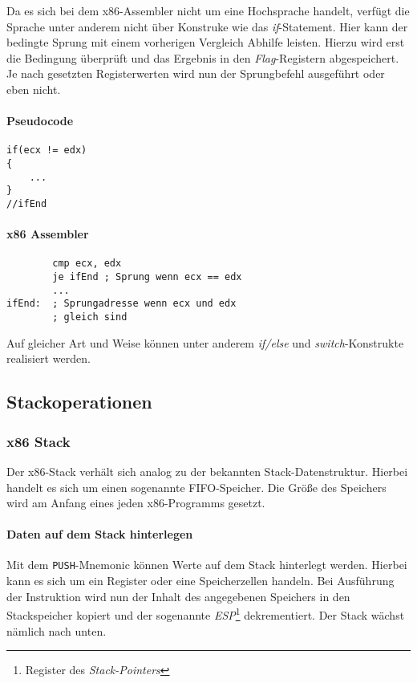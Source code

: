 Da es sich bei dem x86-Assembler nicht um eine Hochsprache handelt, verfügt die Sprache unter anderem nicht über Konstruke wie das \textit{if}-Statement.
Hier kann der bedingte Sprung mit einem vorherigen Vergleich Abhilfe leisten.
Hierzu wird erst die Bedingung überprüft und das Ergebnis in den \textit{Flag}-Registern abgespeichert.
Je nach gesetzten Registerwerten wird nun der Sprungbefehl ausgeführt oder eben nicht.

\paragraph{Pseudocode\newline}\makebox{}
\begin{lstlisting}
if(ecx != edx)
{
	...
}
//ifEnd
\end{lstlisting}

\paragraph{x86 Assembler\newline}\makebox{}
\begin{lstlisting}
        cmp ecx, edx
        je ifEnd ; Sprung wenn ecx == edx
        ...
ifEnd:  ; Sprungadresse wenn ecx und edx
        ; gleich sind 
\end{lstlisting}

Auf gleicher Art und Weise können unter anderem \textit{if/else} und \textit{switch}-Konstrukte realisiert werden.


\subsection{Stackoperationen}
\subsubsection{x86 Stack}
Der x86-Stack verhält sich analog zu der bekannten Stack-Datenstruktur. Hierbei handelt es sich um einen sogenannte FIFO-Speicher.
Die Größe des Speichers wird am Anfang eines jeden x86-Programms gesetzt.

\paragraph{Daten auf dem Stack hinterlegen\newline} 
Mit dem \texttt{PUSH}-Mnemonic können Werte auf dem Stack hinterlegt werden.
Hierbei kann es sich um ein Register oder eine Speicherzellen handeln.
Bei Ausführung der Instruktion wird nun der Inhalt des angegebenen Speichers in den Stackspeicher kopiert
und der sogenannte \textit{ESP}\footnote{Register des \textit{Stack-Pointers}} dekrementiert.
Der Stack wächst nämlich nach unten.

